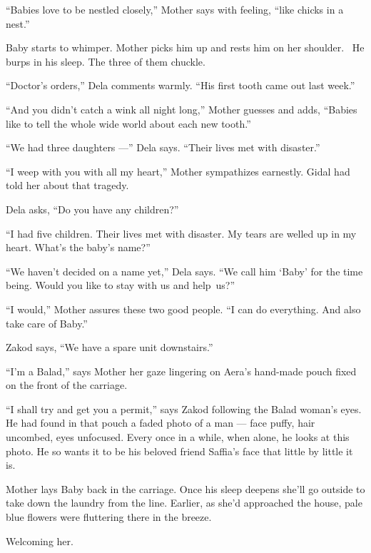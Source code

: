 \documentclass[twoside,11pt]{book}
\begin{document}
``Babies love to be nestled closely,'' Mother says with feeling, ``like chicks in
a nest.''

Baby starts to whimper. Mother picks him up and rests him on her shoulder. ~He burps in his sleep. The three of them
chuckle.

``Doctor's orders,'' Dela comments warmly. ``His first tooth came out last
week.''

``And you didn't catch a wink all night long,'' Mother guesses and adds, ``Babies
like to tell the whole wide world about each new tooth.''

``We had three daughters ---'' Dela says. ``Their lives met with
disaster.''

``I weep with you with all my heart,'' Mother sympathizes earnestly. Gidal had told her about
that tragedy.

Dela asks, ``Do you have any children?''

``I had five children. Their lives met with disaster. My tears are welled up in my heart. What's the baby's
name?''

``We haven't decided on a name yet,'' Dela says. ``We call him `Baby' for the
time being. Would you like to stay with us and help~us?''

``I would,'' Mother assures these two good people. ``I can do everything. And
also take care of Baby.''

Zakod says, ``We have a spare unit downstairs.''

``I'm a Balad,'' says Mother her gaze lingering on Aera's hand-made pouch fixed on the front
of the carriage.

``I shall try and get you a permit,'' says Zakod following the Balad woman's eyes. He had
found in that pouch a faded photo of a man --- face puffy, hair uncombed, eyes unfocused. Every once in a while, when
alone, he looks at this photo. He so wants it to be his beloved friend Saffia's face that little by little it is.

Mother lays Baby back in the carriage. Once his sleep deepens she'll go outside to take down the laundry from the line.
Earlier, as she'd approached the house, pale blue flowers were fluttering there in the breeze.

Welcoming her.
\end{document}
